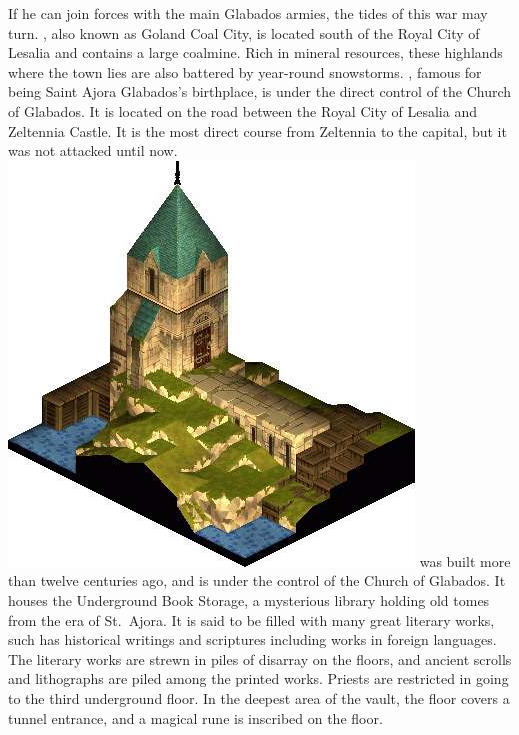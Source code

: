 If he can join forces with the main Glabados armies, the tides of this war may turn.
, also known as Goland Coal City, is located south of the Royal City of Lesalia and contains a large coalmine. 
Rich in mineral resources, these highlands where the town lies are also battered by year-round snowstorms.
, famous for being Saint Ajora Glabados's birthplace, is under the direct control of the Church of Glabados.
It is located on the road between the Royal City of Lesalia and Zeltennia Castle. 
It is the most direct course from Zeltennia to the capital, but it was not attacked until now.
%
\ofpar
\includegraphics[width=\columnwidth]{./art/worldbook/orbonne.jpg}
\ofpar
%
 was built more than twelve centuries ago, and is under the control of the Church of Glabados. 
It houses the Underground Book Storage, a mysterious library holding old tomes from the era of St.~Ajora. 
It is said to be filled with many great literary works, such has historical writings and scriptures including works in foreign languages. 
The literary works are strewn in piles of disarray on the floors, and ancient scrolls and lithographs are piled among the printed works. 
Priests are restricted in going to the third underground floor. 
In the deepest area of the vault, the floor covers a tunnel entrance, and a magical rune is inscribed on the floor.
